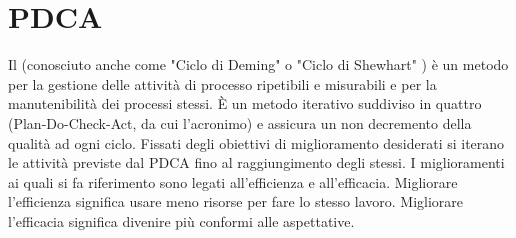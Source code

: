 

\section{PDCA}
		

Il  (conosciuto anche come "Ciclo di Deming" o "Ciclo di Shewhart" ) è un metodo per la gestione delle attività di processo ripetibili e misurabili e per la manutenibilità dei processi stessi. È un metodo iterativo suddiviso in quattro  (Plan-Do-Check-Act, da cui l'acronimo) e assicura un non decremento della qualità ad ogni ciclo. Fissati degli obiettivi di miglioramento desiderati si iterano le attività previste dal PDCA fino al raggiungimento degli stessi. I miglioramenti ai quali si fa riferimento sono legati all'efficienza e all'efficacia. Migliorare l'efficienza significa usare meno risorse per fare lo stesso lavoro. Migliorare l'efficacia significa divenire più conformi alle aspettative.

